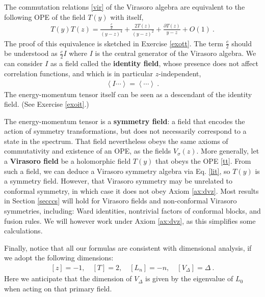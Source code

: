 \documentclass[12pt, a4paper, notitlepage, twoside]{report}
\numberwithin{equation}{section}
\theoremstyle{break}
\begin{document}
The commutation relations \eqref{vir} of the Virasoro algebra are equivalent to the following OPE of the field $T(y)$ with itself,
\begin{align}
 \boxed{T(y)T(z) = \frac{\frac{c}{2}}{(y-z)^4} + \frac{2T(z)}{(y-z)^2} + \frac{\partial T(z)}{y-z} + O(1)}\ .
\label{tt}
\end{align}
The proof of this equivalence is sketched in Exercise \ref{exott}. 
The term $\frac{c}{2}$ should be understood as $\frac{c}{2}I$ where $I$ is the
central generator of the Virasoro algebra.
We can consider $I$ as a field called the 
\textbf{\boldmath identity field}, whose presence does not affect correlation functions, and which is in particular $z$-independent,
\begin{align}
 \left\langle I \cdots \right\rangle = \left\langle \cdots \right\rangle \ .
\label{ivac}
\end{align}
The energy-momentum tensor itself can be seen as a descendant of the identity field. (See Exercise \ref{exoit}.)

The energy-momentum tensor is a \textbf{\boldmath symmetry field}: a field that encodes the action of symmetry transformations, but does not necessarily correspond to a state in the spectrum. 
That field nevertheless obeys the same axioms of commutativity and existence of an OPE, as the fields $V_\sigma(z)$.
More generally, let a \textbf{Virasoro field} be a holomorphic field $T(y)$ that obeys the OPE \eqref{tt}. 
From such a field, we can deduce a Virasoro symmetry algebra via Eq. \eqref{lit}, so $T(y)$ is a symmetry field. However, that Virasoro symmetry may be unrelated to conformal symmetry, in which case it does not obey Axiom \ref{ax:dvz}. 
Most results in Section \ref{secccs} will hold for Virasoro fields and non-conformal Virasoro symmetries, including: Ward identities, nontrivial factors of conformal blocks, and fusion rules. We will however work under Axiom \ref{ax:dvz}, as this simplifies some calculations.

Finally, notice that all our formulas are consistent with dimensional analysis, if we adopt the following dimensions:
\begin{align}
 \boxed{[z]=-1,\quad [T]=2, \quad [L_n]=-n, \quad [V_\Delta]=\Delta}\ .
\label{zaz}
\end{align}
Here we anticipate that the dimension of $V_\Delta$ is given by the eigenvalue of $L_0$ when acting on that primary field.
\end{document}
